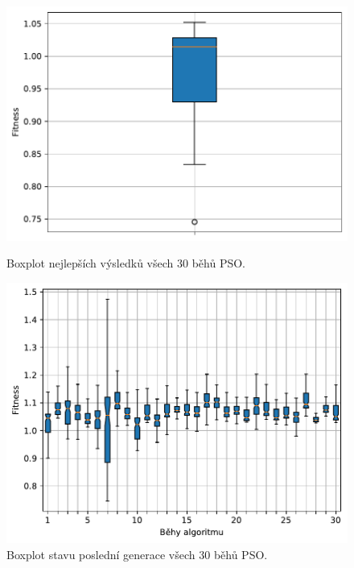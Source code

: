 \begin{figure}[H]
\begin{minipage}[t]{0.475\linewidth}
\includegraphics[width=\linewidth]{obrazky-figures/statistics/Benchmarks/Griewank/PSO/bestsBoxplot_WithOutliers.pdf}
\caption{Boxplot nejlepších výsledků všech $30$ běhů PSO.}
\label{fg:bench:griewank:pso:best}
\end{minipage}
\hfill
\begin{minipage}[t]{0.475\linewidth}
\includegraphics[width=\linewidth]{obrazky-figures/statistics/Benchmarks/Griewank/PSO/lastGenBoxplots.pdf}
\caption{Boxplot stavu poslední generace všech $30$ běhů PSO.}
\label{fg:bench:griewank:pso:lastGen}
\end{minipage}
\end{figure}

